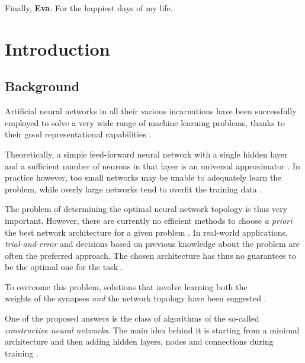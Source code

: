 \documentclass[11pt,a4paper]{report}
\begin{document}
	Finally, \textbf{Eva}. For the happiest days of my life.
	
	
	\renewcommand*\contentsname{Table of Contents}
	\tableofcontents

	\printnomenclature[0.7in]
	\listoffigures
	\listoftables
	
	
	\chapter{Introduction}
		\section{Background}
			\label{sec:background}
			Artificial neural networks in all their various incarnations have been successfully employed to solve a very wide range of machine learning problems, thanks to their good representational capabilities \cite{sharma2010constructive}.
		
			Theoretically, a simple feed-forward neural network with a single hidden layer and a sufficient number of neurons in that layer is an universal approximator \cite{hornik1989multilayer,kuurkova1992kolmogorov}. In practice however, too small networks may be unable to adequately learn the problem, while overly large networks tend to overfit the training data \cite{parekh2000constructive}.
		
			The problem of determining the optimal neural network topology is thus very important. However, there are currently no efficient methods to choose \emph{a priori} the best network architecture for a given problem \cite{parekh2000constructive}. In real-world applications, \emph{trial-and-error} and decisions based on previous knowledge about the problem are often the preferred approach. The chosen architecture has thus no guarantees to be the optimal one for the task \cite{sharma2010constructive}.
		
			To overcome this problem, solutions that involve learning both the\\weights of the synapses \emph{and} the network topology have been suggested \cite{parekh2000constructive}.
		
			One of the proposed answers is the class of algorithms of the so-called \emph{constructive neural networks}. The main idea behind it is starting from a minimal architecture and then adding hidden layers, nodes and connections during training \cite{kotsiantis2007supervised,sharma2010constructive}.
		
\end{document}
